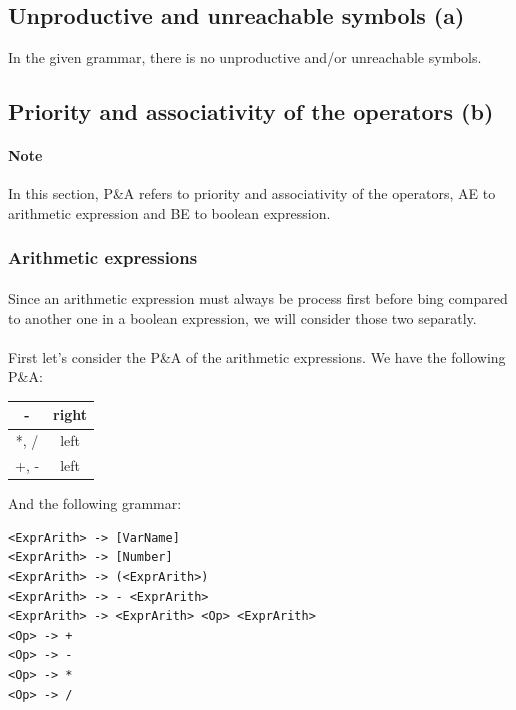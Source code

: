 \documentclass[letterpaper]{article}
\begin{document}
\subsection{Unproductive and unreachable symbols (a)}

In the given grammar, there is no unproductive and/or unreachable symbols.

\subsection{Priority and associativity of the operators (b)}

\paragraph{Note} In this section, P\&A refers to priority and associativity
of the operators, AE to arithmetic expression and BE to boolean expression.

\subsubsection{Arithmetic expressions}

\paragraph{}

Since an arithmetic expression must always be process first before bing compared
to another one in a boolean expression, we will consider those two separatly.

\paragraph{}

First let's consider the P\&A of the arithmetic expressions. We have the
following P\&A:

\begin{tabular}{|c|c|}
    \hline
    - & right \\
    \hline
    *, / & left \\
    \hline
    +, - & left \\
    \hline
\end{tabular}

 And the following grammar:

\begin{lstlisting}
<ExprArith> -> [VarName]
<ExprArith> -> [Number]
<ExprArith> -> (<ExprArith>)
<ExprArith> -> - <ExprArith>
<ExprArith> -> <ExprArith> <Op> <ExprArith>
<Op> -> +
<Op> -> -
<Op> -> *
<Op> -> /
\end{lstlisting}
\end{document}
